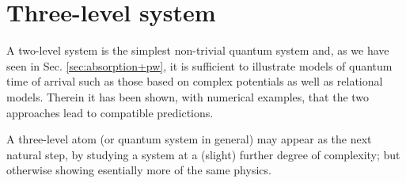 \section{Three-level system}\label{sec:pw3l}

A two-level system is the simplest non-trivial quantum system and,
as we have seen in Sec. \ref{sec:absorption+pw},
it is sufficient to illustrate
models of quantum time of arrival
such as those based on complex potentials as well as relational models.
Therein it has been shown, with numerical examples, that the two approaches lead to
compatible predictions.

A three-level atom (or quantum system in general) may appear as
the next natural step, by studying a system at a (slight) further
degree of complexity; but otherwise showing esentially more of
the same physics.
